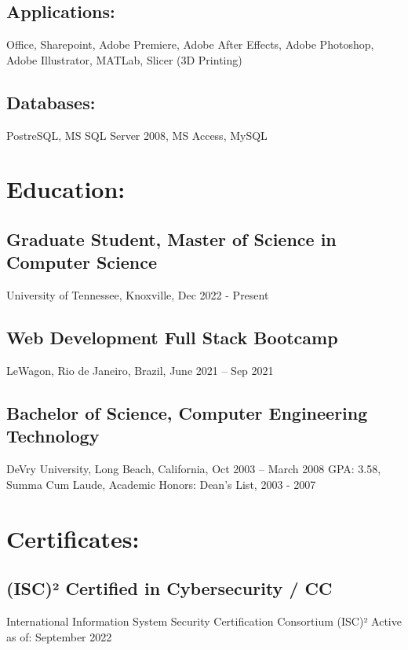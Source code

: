 \documentclass[letter,10pt]{article}
\begin{document}
\subsection*{Applications:}
\label{sec:orgb660565}
Office, Sharepoint, Adobe Premiere, Adobe After Effects, Adobe Photoshop, Adobe Illustrator, MATLab, Slicer (3D Printing)
\subsection*{Databases:}
\label{sec:org67b5c2c}
PostreSQL, MS SQL Server 2008, MS Access, MySQL
\section*{Education:}
\label{sec:org7de0e07}
\subsection*{Graduate Student, Master of Science in Computer Science}
\label{sec:org870d962}
University of Tennessee, Knoxville, Dec 2022 - Present
\subsection*{Web Development Full Stack Bootcamp}
\label{sec:orgea83953}
LeWagon, Rio de Janeiro, Brazil, June 2021 – Sep 2021
\subsection*{Bachelor of Science, Computer Engineering Technology}
\label{sec:org8e04c68}
DeVry University, Long Beach, California, Oct 2003 – March 2008
GPA: 3.58, Summa Cum Laude, Academic Honors: Dean’s List, 2003 - 2007

\section*{Certificates:}
\label{sec:orgf344152}
\subsection*{(ISC)² Certified in Cybersecurity / CC}
\label{sec:orgc5242fa}
International Information System Security Certification Consortium (ISC)²
Active as of: September 2022
\end{document}

